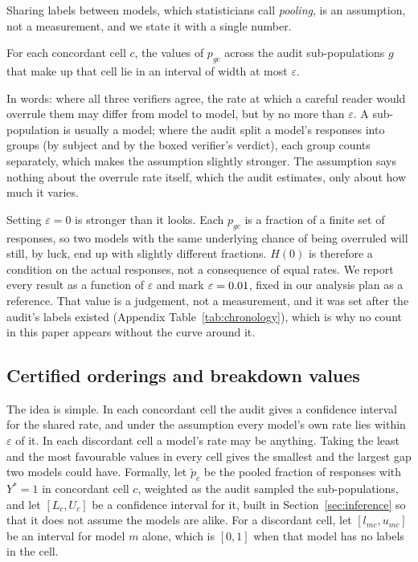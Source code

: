 Sharing labels between models, which statisticians call \emph{pooling}, is an assumption, not a
measurement, and we state it with a single number.

\begin{assumption}
\label{ass:h}
For each concordant cell $c$, the values of $p_{gc}$ across the audit sub-populations $g$ that
make up that cell lie in an interval of width at most $\varepsilon$.
\end{assumption}

In words: where all three verifiers agree, the rate at which a careful reader would overrule them
may differ from model to model, but by no more than $\varepsilon$. A sub-population is usually a
model; where the audit split a model's responses into groups (by subject and by the boxed
verifier's verdict), each group counts separately, which makes the assumption slightly stronger.
The assumption says nothing about the overrule rate itself, which the audit estimates, only about
how much it varies.

Setting $\varepsilon = 0$ is stronger than it looks. Each $p_{gc}$ is a fraction of a finite set of
responses, so two models with the same underlying chance of being overruled will still, by luck,
end up with slightly different fractions. $H(0)$ is therefore a condition on the actual responses,
not a consequence of equal rates. We report every result as a function of $\varepsilon$ and mark
$\varepsilon = 0.01$, fixed in our analysis plan as a reference. That value is a judgement,
not a measurement, and it was set after the audit's labels existed (Appendix
Table~\ref{tab:chronology}), which is why no count in this paper appears without the curve around
it.

\subsection{Certified orderings and breakdown values}

The idea is simple. In each concordant cell the audit gives a confidence interval for the shared
rate, and under the assumption every model's own rate lies within $\varepsilon$ of it. In each
discordant cell a model's rate may be anything. Taking the least and the most favourable values in
every cell gives the smallest and the largest gap two models could have. Formally, let $\tilde p_c$
be the pooled fraction of responses with $Y^* = 1$ in concordant cell $c$,
weighted as the audit sampled the sub-populations, and let $[L_c, U_c]$ be a confidence interval
for it, built in Section~\ref{sec:inference} so that it does not assume the models are alike. For a
discordant cell, let $[l_{mc}, u_{mc}]$ be an interval for model $m$ alone, which is $[0,1]$ when
that model has no labels in the cell.

